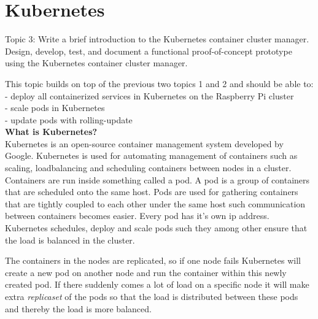 \chapter{Kubernetes}\label{ch:kubernetes}
Topic 3: Write a brief introduction to the Kubernetes container cluster manager. 
Design, develop, test, and document a functional proof-of-concept prototype using the Kubernetes container cluster manager. 

This topic builds on top of the previous two topics 1 and 2 and should be able to:\\
- deploy all containerized services in Kubernetes on the Raspberry Pi cluster \\
- scale pods in Kubernetes \\
- update pods with rolling-update \\

\textbf{What is Kubernetes?}\\
Kubernetes is an open-source container management system developed by Google.
Kubernetes is used for automating management of containers such as scaling, loadbalancing and scheduling containers between nodes in a cluster. Containers are run inside something called a pod.
A pod is a group of containers that are scheduled onto the same host.
Pods are used for gathering containers that are tightly coupled to each other under the same host such communication between containers becomes easier. Every pod has it's own ip address. Kubernetes schedules, deploy and scale pods such they among other ensure that the load is balanced in the cluster. 

The containers in the nodes are replicated, so if one node fails Kubernetes will create a new pod on another node and run the container within this newly created pod. 
If there suddenly comes a lot of load on a specific node it will make extra \emph{replicaset} of the pods so that the load is distributed between these pods and thereby the load is more balanced. 

